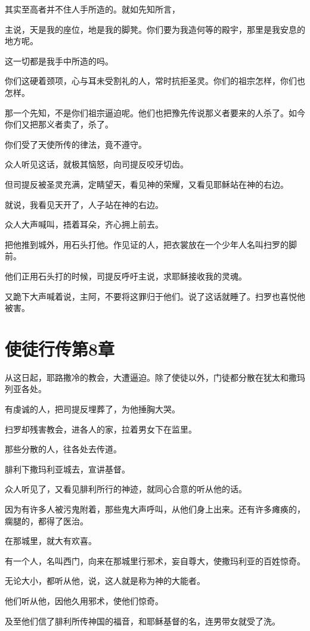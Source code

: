 \documentclass[12pt,oneside]{book}
\begin{document}
其实至高者并不住人手所造的。就如先知所言，

主说，天是我的座位，地是我的脚凳。你们要为我造何等的殿宇，那里是我安息的地方呢。

这一切都是我手中所造的吗。

你们这硬着颈项，心与耳未受割礼的人，常时抗拒圣灵。你们的祖宗怎样，你们也怎样。

那一个先知，不是你们祖宗逼迫呢。他们也把豫先传说那义者要来的人杀了。如今你们又把那义者卖了，杀了。

你们受了天使所传的律法，竟不遵守。

众人听见这话，就极其恼怒，向司提反咬牙切齿。

但司提反被圣灵充满，定睛望天，看见神的荣耀，又看见耶稣站在神的右边。

就说，我看见天开了，人子站在神的右边。

众人大声喊叫，捂着耳朵，齐心拥上前去。

把他推到城外，用石头打他。作见证的人，把衣裳放在一个少年人名叫扫罗的脚前。

他们正用石头打的时候，司提反呼吁主说，求耶稣接收我的灵魂。

又跪下大声喊着说，主阿，不要将这罪归于他们。说了这话就睡了。扫罗也喜悦他被害。

\chapter{使徒行传第8章}
从这日起，耶路撒冷的教会，大遭逼迫。除了使徒以外，门徒都分散在犹太和撒玛列亚各处。

有虔诚的人，把司提反埋葬了，为他捶胸大哭。

扫罗却残害教会，进各人的家，拉着男女下在监里。

那些分散的人，往各处去传道。

腓利下撒玛利亚城去，宣讲基督。

众人听见了，又看见腓利所行的神迹，就同心合意的听从他的话。

因为有许多人被污鬼附着，那些鬼大声呼叫，从他们身上出来。还有许多瘫痪的，瘸腿的，都得了医治。

在那城里，就大有欢喜。

有一个人，名叫西门，向来在那城里行邪术，妄自尊大，使撒玛利亚的百姓惊奇。

无论大小，都听从他，说，这人就是称为神的大能者。

他们听从他，因他久用邪术，使他们惊奇。

及至他们信了腓利所传神国的福音，和耶稣基督的名，连男带女就受了洗。
\end{document}
